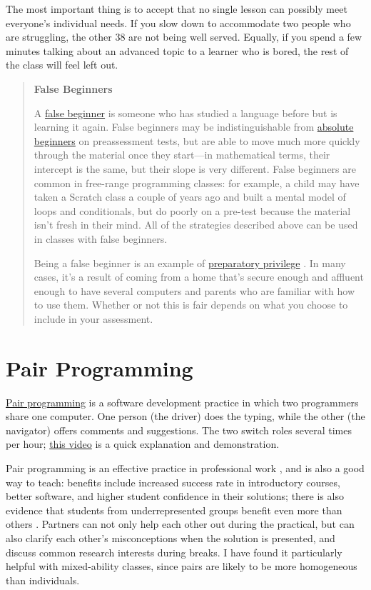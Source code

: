 The most important thing is to accept that no single lesson can possibly
meet everyone's individual needs. If you slow down to accommodate two
people who are struggling, the other 38 are not being well served.
Equally, if you spend a few minutes talking about an advanced topic to a
learner who is bored, the rest of the class will feel left out.

\begin{quote}\setlength{\parindent}{0pt}
\textbf{False Beginners}

A \protect\hyperlink{g:false-beginner}{false beginner} is someone who has
studied a language before but is learning it again. False beginners
may be indistinguishable from
\protect\hyperlink{g:absolute-beginner}{absolute beginners} on preassessment
tests, but are able to move much more quickly through the material
once they start---in mathematical terms, their intercept is the same,
but their slope is very different. False beginners are common in
free-range programming classes: for example, a child may have taken a
Scratch class a couple of years ago and built a mental model of loops
and conditionals, but do poorly on a pre-test because the material
isn't fresh in their mind. All of the strategies described above can
be used in classes with false beginners.

Being a false beginner is an example of
\protect\hyperlink{g:preparatory-privilege}{preparatory privilege}
\cite{Marg2010}. In many cases, it's a result of coming from a home
that's secure enough and affluent enough to have several computers and
parents who are familiar with how to use them. Whether or not this is
fair depends on what you choose to include in your assessment.
\end{quote}

\section{Pair Programming}\label{s:classroom-pair}

\protect\hyperlink{g:pair-programming}{Pair programming} is a software development
practice in which two programmers share one computer. One person (the
driver) does the typing, while the other (the navigator) offers
comments and suggestions. The two switch roles several times per hour;
\href{https://www.youtube.com/watch?v=vgkahOzFH2Q}{this video} is a quick explanation and
demonstration.

Pair programming is an effective practice in professional work
\cite{Hann2009}, and is also a good way to teach: benefits include
increased success rate in introductory courses, better software, and
higher student confidence in their solutions; there is also evidence
that students from underrepresented groups benefit even more than
others
\cite{McDo2006,Hank2011,Port2013,Cele2018}.
Partners can not only help each other out during the practical, but
can also clarify each other's misconceptions when the solution is
presented, and discuss common research interests during breaks. I have
found it particularly helpful with mixed-ability classes, since pairs
are likely to be more homogeneous than individuals.

